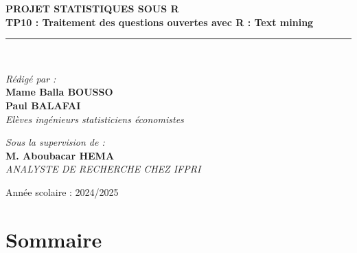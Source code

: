 \documentclass[
]{article}
\begin{document}
\begin{titlepage}
\begin{center}
        \textbf{\LARGE PROJET STATISTIQUES SOUS R }\\[0.3cm]
        \textbf{\Huge \color{blue} \textsf{TP10 : Traitement des questions ouvertes avec R : Text mining}}\\[0.2cm]
        \rule{\linewidth}{0.2mm} \\[0.5cm]
        
        \begin{minipage}{0.5\textwidth}
    \begin{flushleft} \large
        \emph{\textsf{Rédigé par :}}\\
        \textbf{Mame Balla BOUSSO}\\
        \textbf{Paul BALAFAI}\\
        \textit{Elèves ingénieurs statisticiens économistes}
    \end{flushleft}
\end{minipage}
        \hfill
        \begin{minipage}{0.4\textwidth}
            \begin{flushright} \large
                \emph{\textsf{Sous la supervision de :}} \\
                \textbf{M. Aboubacar HEMA}\\
                \textit{ANALYSTE DE RECHERCHE CHEZ IFPRI }
            \end{flushright}
        \end{minipage}

        \vfill

        {\large \textsf{Année scolaire : 2024/2025}}\\[0.5cm]
        
    \end{center}
\end{titlepage}

\newpage

\section{Sommaire}\label{sommaire}
\end{document}
